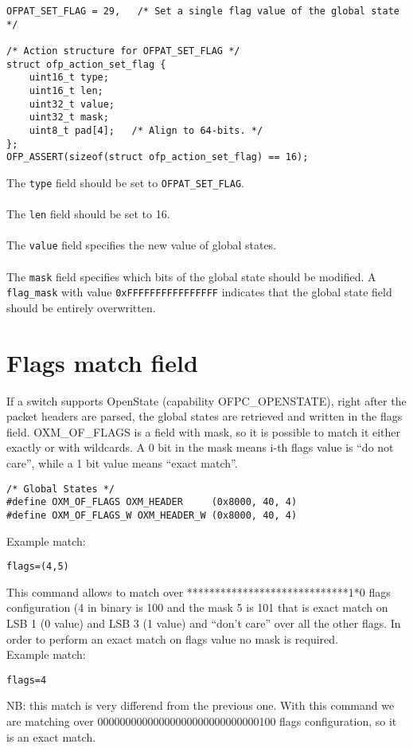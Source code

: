 \scriptsize\begin{verbatim}
OFPAT_SET_FLAG = 29,   /* Set a single flag value of the global state */

/* Action structure for OFPAT_SET_FLAG */
struct ofp_action_set_flag {
    uint16_t type;
    uint16_t len; 
    uint32_t value;
    uint32_t mask;   
    uint8_t pad[4];   /* Align to 64-bits. */
};
OFP_ASSERT(sizeof(struct ofp_action_set_flag) == 16);
\end{verbatim}\normalsize

\noindent
The \texttt{type} field should be set to \texttt{OFPAT\_SET\_FLAG}.
\\\\
The \texttt{len} field should be set to 16.
\\\\
The \texttt{value} field specifies the new value of global states.
\\\\
The \texttt{mask} field specifies which bits of the global state should be modified. A \texttt{flag\_mask} with value \texttt{0xFFFFFFFFFFFFFFFF} indicates that the global state field should be entirely overwritten.


\section{Flags match field}
\label{section:oxm_of_flags}

If a switch supports OpenState (capability OFPC\_OPENSTATE), right after the packet headers are parsed, the global states are retrieved and written in the flags field. OXM\_OF\_FLAGS is a field with mask, so it is possible to match it either exactly or with wildcards. A 0 bit in the mask means i-th flags value is ``do not care'', while a 1 bit value means ``exact match''.

\scriptsize\begin{verbatim}
/* Global States */
#define OXM_OF_FLAGS OXM_HEADER     (0x8000, 40, 4)
#define OXM_OF_FLAGS_W OXM_HEADER_W (0x8000, 40, 4)
\end{verbatim}\normalsize
Example match:
\scriptsize\begin{verbatim}
flags=(4,5)
\end{verbatim}\normalsize
This command allows to match over *****************************1*0 flags configuration (4 in binary is 100 and the mask 5 is 101 that is exact match on LSB 1 (0 value) and LSB 3 (1 value) and ``don’t care'' over all the other flags. In order to perform an exact match on flags value no mask is required.
\\Example match:
\scriptsize\begin{verbatim}
flags=4
\end{verbatim}\normalsize
NB: this match is very differend from the previous one. With this command we are matching over 00000000000000000000000000000100 flags configuration, so it is an exact match.

